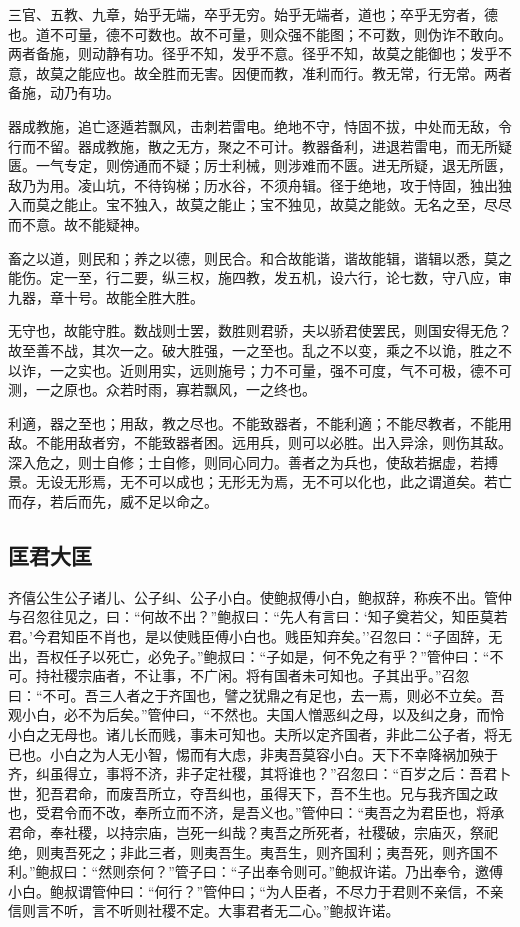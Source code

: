 \documentclass[]{article}
\begin{document}
三官、五教、九章，始乎无端，卒乎无穷。始乎无端者，道也；卒乎无穷者，德也。道不可量，德不可数也。故不可量，则众强不能图；不可数，则伪诈不敢向。两者备施，则动静有功。径乎不知，发乎不意。径乎不知，故莫之能御也；发乎不意，故莫之能应也。故全胜而无害。因便而教，准利而行。教无常，行无常。两者备施，动乃有功。

器成教施，追亡逐遁若飘风，击刺若雷电。绝地不守，恃固不拔，中处而无敌，令行而不留。器成教施，散之无方，聚之不可计。教器备利，进退若雷电，而无所疑匮。一气专定，则傍通而不疑；厉士利械，则涉难而不匮。进无所疑，退无所匮，敌乃为用。凌山坑，不待钩梯；历水谷，不须舟辑。径于绝地，攻于恃固，独出独入而莫之能止。宝不独入，故莫之能止；宝不独见，故莫之能敛。无名之至，尽尽而不意。故不能疑神。

畜之以道，则民和；养之以德，则民合。和合故能谐，谐故能辑，谐辑以悉，莫之能伤。定一至，行二要，纵三权，施四教，发五机，设六行，论七数，守八应，审九器，章十号。故能全胜大胜。

无守也，故能守胜。数战则士罢，数胜则君骄，夫以骄君使罢民，则国安得无危？故至善不战，其次一之。破大胜强，一之至也。乱之不以变，乘之不以诡，胜之不以诈，一之实也。近则用实，远则施号；力不可量，强不可度，气不可极，德不可测，一之原也。众若时雨，寡若飘风，一之终也。

利適，器之至也；用敌，教之尽也。不能致器者，不能利適；不能尽教者，不能用敌。不能用敌者穷，不能致器者困。远用兵，则可以必胜。出入异涂，则伤其敌。深入危之，则士自修；士自修，则同心同力。善者之为兵也，使敌若据虚，若搏景。无设无形焉，无不可以成也；无形无为焉，无不可以化也，此之谓道矣。若亡而存，若后而先，威不足以命之。

\hypertarget{header-n319}{%
\subsection{匡君大匡}\label{header-n319}}

齐僖公生公子诸儿、公子纠、公子小白。使鲍叔傅小白，鲍叔辞，称疾不出。管仲与召忽往见之，曰：``何故不出？''鲍叔曰：``先人有言曰：`知子奠若父，知臣莫若君。'今君知臣不肖也，是以使贱臣傅小白也。贱臣知弃矣。''召忽曰：``子固辞，无出，吾权任子以死亡，必免子。''鲍叔曰：``子如是，何不免之有乎？''管仲曰：``不可。持社稷宗庙者，不让事，不广闲。将有国者未可知也。子其出乎。''召忽曰：``不可。吾三人者之于齐国也，譬之犹鼎之有足也，去一焉，则必不立矣。吾观小白，必不为后矣。''管仲曰，``不然也。夫国人憎恶纠之母，以及纠之身，而怜小白之无母也。诸儿长而贱，事未可知也。夫所以定齐国者，非此二公子者，将无已也。小白之为人无小智，惕而有大虑，非夷吾莫容小白。天下不幸降祸加殃于齐，纠虽得立，事将不济，非子定社稷，其将谁也？''召忽曰：``百岁之后：吾君卜世，犯吾君命，而废吾所立，夺吾纠也，虽得天下，吾不生也。兄与我齐国之政也，受君令而不改，奉所立而不济，是吾义也。''管仲曰：``夷吾之为君臣也，将承君命，奉社稷，以持宗庙，岂死一纠哉？夷吾之所死者，社稷破，宗庙灭，祭祀绝，则夷吾死之；非此三者，则夷吾生。夷吾生，则齐国利；夷吾死，则齐国不利。''鲍叔曰：``然则奈何？''管子曰：``子出奉令则可。''鲍叔许诺。乃出奉令，邀傅小白。鲍叔谓管仲曰：``何行？''管仲曰；``为人臣者，不尽力于君则不亲信，不亲信则言不听，言不听则社稷不定。大事君者无二心。''鲍叔许诺。
\end{document}
